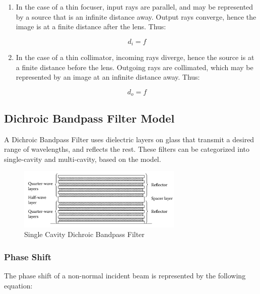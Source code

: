 \documentclass{article}
\begin{document}
\begin{enumerate}
    \item In the case of a thin focuser, input rays are parallel, and may be represented by a source that is an infinite distance away. Output rays converge, hence the image is at a finite distance after the lens. Thus:
    
    \begin{equation} \label{eq:image-distance}
        {d_i = f}    
    \end{equation}
    
    \item In the case of a thin collimator, incoming rays diverge, hence the source is at a finite distance before the lens. Outgoing rays are collimated, which may be represented by an image at an infinite distance away. Thus:
    
    \begin{equation} \label{eq:source-distance}
        {d_o = f}
    \end{equation}
\end{enumerate}

\subsection{Dichroic Bandpass Filter Model}

A Dichroic Bandpass Filter uses dielectric layers on glass that transmit a desired range of wavelengths, and reflects the rest. These filters can be categorized into single-cavity and multi-cavity, based on the model.

\begin{figure}[H]
    \centering
    \includegraphics[width=0.7\textwidth]{figures/Single_Layer_Dichroic.png}
    \caption{Single Cavity Dichroic Bandpass Filter}
    \label{fig:my_label}
\end{figure}

\subsubsection{Phase Shift}
The phase shift of a non-normal incident beam is represented by the following equation:
\end{document}
